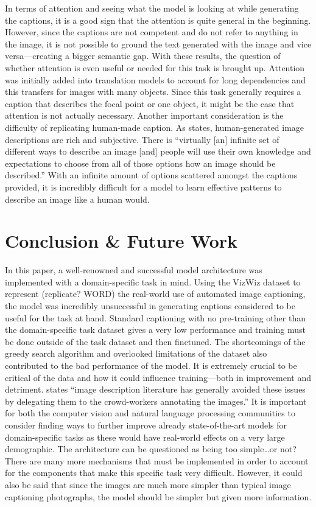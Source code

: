 \documentclass[11pt,a4paper]{article}
\begin{document}
In terms of attention and seeing what the model is looking at while generating the captions, it is a good sign that the attention is quite general in the beginning. However, since the captions are not competent and do not refer to anything in the image, it is not possible to ground the text generated with the image and vice versa—creating a bigger semantic gap. With these results, the question of whether attention is even useful or needed for this task is brought up. Attention was initially added into translation models to account for long dependencies and this transfers for images with many objects. Since this task generally requires a caption that describes the focal point or one object, it might be the case that attention is not actually necessary. Another important consideration is the difficulty of replicating human-made caption. As \citet{miltenburg-pragmatic} states, human-generated image descriptions are rich and subjective. There is “virtually [an] infinite set of different ways to describe an image [and] people will use their own knowledge and expectations to choose from all of those options how an image should be described.” \citep{miltenburg-pragmatic} With an infinite amount of options scattered amongst the captions provided, it is incredibly difficult for a model to learn effective patterns to describe an image like a human would.

\section{Conclusion \& Future Work}
\label{sec:conc&fw}
In this paper, a well-renowned and successful model architecture was implemented with a domain-specific task in mind. Using the VizWiz dataset to represent (replicate? WORD) the real-world use of automated image captioning, the model was incredibly unsuccessful in generating captions considered to be useful for the task at hand. Standard captioning with no pre-training other than the domain-specific task dataset gives a very low performance and training must be done outside of the task dataset and then finetuned. The shortcomings of the greedy search algorithm and overlooked limitations of the dataset also contributed to the bad performance of the model. It is extremely crucial to be critical of the data and how it could influence training—both in improvement and detriment. \citet{miltenburg-pragmatic} states “image description literature has generally avoided these issues by delegating them to the crowd-workers annotating the images.” It is important for both the computer vision and natural language processing communities to consider finding ways to further improve already state-of-the-art models for domain-specific tasks as these would have real-world effects on a very large demographic. The architecture can be questioned as being too simple…or not? There are many more mechanisms that must be implemented in order to account for the components that make this specific task very difficult. However, it could also be said that since the images are much more simpler than typical image captioning photographs, the model should be simpler but given more information. 
\end{document}
